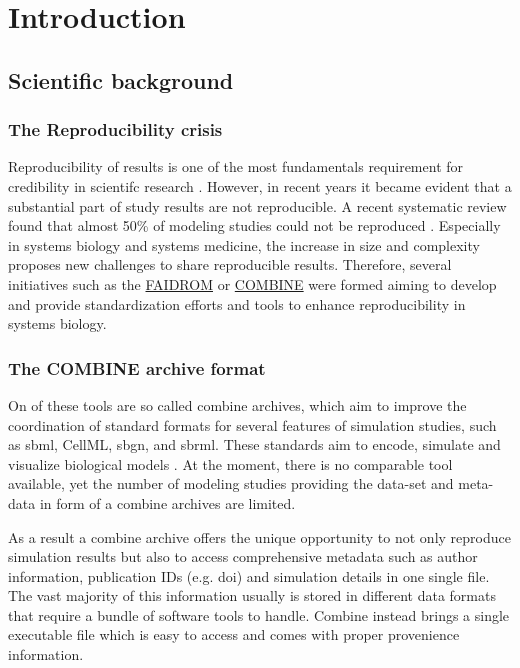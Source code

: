 \section*{Introduction}


\subsection*{Scientific background}
\subsubsection*{The Reproducibility crisis}
Reproducibility of results is one of the most fundamentals requirement for credibility in scientifc research \cite{tiwari2021reproducibility}. However, in recent years it became evident that a substantial part of study results are not reproducible. A recent systematic review found that almost 50\% of modeling studies could not be reproduced \cite{tiwari2021reproducibility}. Especially in systems biology and systems medicine, the increase in size and complexity proposes new challenges to share reproducible results. Therefore, several initiatives such as the \hyperlink{https://fair-dom.org/}{FAIDROM} or \hyperlink{http://co.mbine.org/}{COMBINE} were formed aiming to develop and provide standardization efforts and tools to enhance reproducibility in systems biology.

\subsubsection*{The COMBINE archive format}
On of these tools are so called \ac{combine} archives, which aim to improve the coordination of standard formats for several features of simulation studies, such as \ac{sbml}, CellML, \ac{sbgn}, and \ac{sbrml}. These standards aim to encode, simulate and visualize biological models \cite{combine}. At the moment, there is no comparable tool available, yet the number of modeling studies providing the data-set and meta-data in form of a \ac{combine} archives are limited. 

As a result a \ac{combine} archive offers the unique opportunity to not only reproduce simulation results but also to access comprehensive metadata such as author information, publication IDs (e.g. \ac{doi}) and simulation details in one single file. The vast majority of this information usually  is stored in different data formats that require a bundle of software tools to handle. Combine instead brings a single executable file which is easy to access and comes with proper provenience information.

